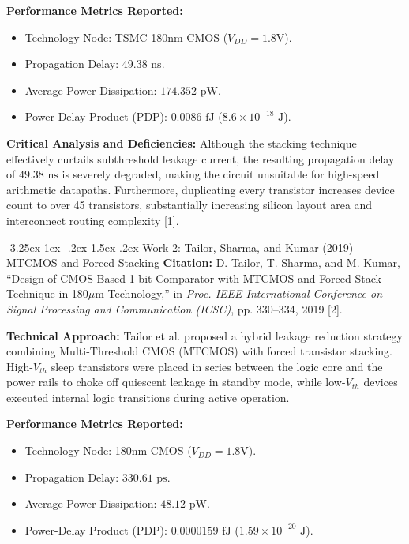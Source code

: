 \documentclass[12pt,a4paper,oneside]{report}
\makeatletter
\renewcommand\subsection{\@startsection{subsection}{2}{\z@}%
                                     {-3.25ex\@plus -1ex \@minus -.2ex}%
                                     {1.5ex \@plus .2ex}%
                                     {\normalfont\normalsize\bfseries\itshape}}
\makeatother
\begin{document}
\noindent\textbf{Performance Metrics Reported:}
\begin{itemize}
\item Technology Node: TSMC 180nm CMOS ($V_{DD} = 1.8\text{V}$).
\item Propagation Delay: $49.38\text{ ns}$.
\item Average Power Dissipation: $174.352\text{ pW}$.
\item Power-Delay Product (PDP): $0.0086\text{ fJ}$ ($8.6\times 10^{-18}\text{ J}$).
\end{itemize}

\noindent\textbf{Critical Analysis and Deficiencies:} Although the stacking technique effectively curtails subthreshold leakage current, the resulting propagation delay of $49.38\text{ ns}$ is severely degraded, making the circuit unsuitable for high-speed arithmetic datapaths. Furthermore, duplicating every transistor increases device count to over 45 transistors, substantially increasing silicon layout area and interconnect routing complexity [1].

\subsection{Work 2: Tailor, Sharma, and Kumar (2019) -- MTCMOS and Forced Stacking}
\textbf{Citation:} D. Tailor, T. Sharma, and M. Kumar, ``Design of CMOS Based 1-bit Comparator with MTCMOS and Forced Stack Technique in 180$\mu$m Technology,'' in \textit{Proc. IEEE International Conference on Signal Processing and Communication (ICSC)}, pp. 330--334, 2019 [2].

\noindent\textbf{Technical Approach:} Tailor et al. proposed a hybrid leakage reduction strategy combining Multi-Threshold CMOS (MTCMOS) with forced transistor stacking. High-$V_{th}$ sleep transistors were placed in series between the logic core and the power rails to choke off quiescent leakage in standby mode, while low-$V_{th}$ devices executed internal logic transitions during active operation.

\noindent\textbf{Performance Metrics Reported:}
\begin{itemize}
\item Technology Node: 180nm CMOS ($V_{DD} = 1.8\text{V}$).
\item Propagation Delay: $330.61\text{ ps}$.
\item Average Power Dissipation: $48.12\text{ pW}$.
\item Power-Delay Product (PDP): $0.0000159\text{ fJ}$ ($1.59\times 10^{-20}\text{ J}$).
\end{itemize}
\end{document}
